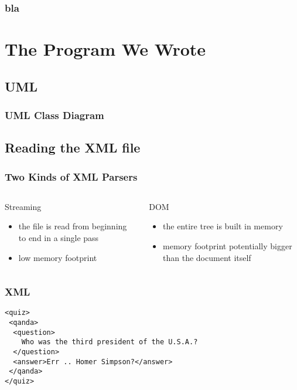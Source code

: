 \documentclass{beamer}
\begin{document}
\begin{frame}
  \frametitle{bla}
\end{frame}

\section{The Program We Wrote}

\subsection{UML}

\begin{frame}
  \frametitle{UML Class Diagram}
  \begin{figure}[htbp]
    \centering
    
  \end{figure}
\end{frame}

\subsection{Reading the XML file}

\begin{frame}
  \frametitle{Two Kinds of XML Parsers}

  \begin{columns}
    \begin{block}{Streaming}
      \begin{itemize}
        \item the file is read from beginning to end in a single pass
        \item low memory footprint
      \end{itemize}
    \end{block}
    \begin{block}{DOM}
      \begin{itemize}
      \item the entire tree is built in memory
      \item memory footprint potentially bigger than the document itself
      \end{itemize}
    \end{block}
  \end{columns}
\end{frame}


\begin{frame}[fragile]

  \frametitle{XML}

\begin{verbatim}
<quiz>
 <qanda>
  <question>
    Who was the third president of the U.S.A.?
  </question>
  <answer>Err .. Homer Simpson?</answer>
 </qanda>
</quiz>
\end{verbatim}

\end{frame}
\end{document}
